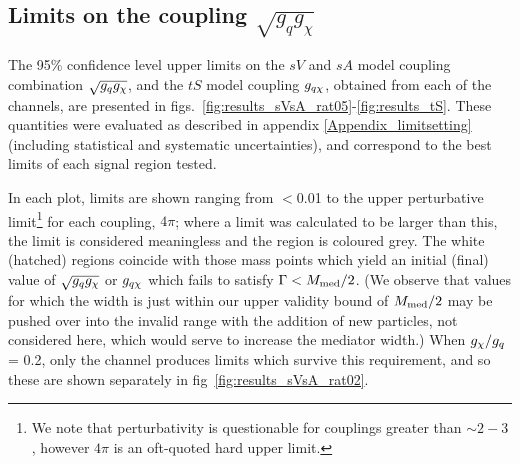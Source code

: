 \subsection{Limits on the coupling $\sqrt{g_{q}g_{\chi}}$}
The 95\% confidence level upper limits on the $sV$ and $sA$ model coupling combination $\sqrt{g_q g_{\chi}}$, and the $tS$ model coupling $g_{q \chi}$, obtained from each of the \monoX channels, are presented in figs.~\ref{fig:results_sVsA_rat05}-\ref{fig:results_tS}. These quantities were evaluated as described in appendix \ref{Appendix_limitsetting} (including statistical and systematic uncertainties), and correspond to the best limits of each signal region tested.

In each plot, limits are shown ranging from $<$0.01 to the upper perturbative limit\footnote{We note that perturbativity is questionable for couplings greater than $\sim 2-3$, however $4\pi$ is an oft-quoted hard upper limit.} for each coupling, $4\pi$; where a limit was calculated to be larger than this, the limit is considered meaningless and the region is coloured grey. The white (hatched) regions coincide with those mass points which yield an initial (final) value of $\sqrt{g_q g_{\chi}}$ or $g_{q \chi}$ which fails to satisfy $\Gamma < M_{\mathrm{med}} / 2$. (We observe that values for which the width is just within our upper validity bound of $M_{\mathrm{med}}/2$ may be pushed over into the invalid range with the addition of new particles, not considered here, which would serve to increase the mediator width.) When $g_{\chi} / g_q$ = 0.2, only the \monojet channel produces limits which survive this requirement, and so these are shown separately in fig~\ref{fig:results_sVsA_rat02}.


